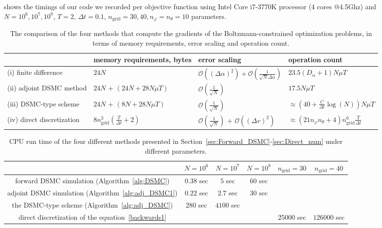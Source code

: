 \documentclass[times,final,nopreprintline]{elsarticle}
\newcommand{\cO}{\mathcal O} \newcommand{\cP}{\mathcal P}
\begin{document}
 shows the timings of our code we recorded per objective function using Intel Core i7-3770K processor (4 cores @4.5Ghz) and $N=10^6,10^7,10^8$, $T=2$, $\Delta t=0.1$, $n_\text{grid}=30,40, n_{\varphi}=n_{\theta}=10$ parameters.

\begin{table} %
\footnotesize
\setlength{\tabcolsep}{4pt}
\centering 
\begin{tabular}{|m{3.2cm}|m{3.3cm}|m{3.0cm}|m{3.1cm}|} 
  \hline
   &  memory requirements, bytes  & error scaling & operation count \\
  \hline 
(i) finite difference                         &    $24N$                                  & $\cO((\Delta \alpha)^2)+\cO(\frac{1}{\sqrt{N} \Delta \alpha})$    &  $23.5 (D_\alpha+1) N\mu T$  \\
(ii) adjoint DSMC method                                      &  $24N$ + $(24N + 28 N\mu T)$                    & $\cO(\frac{1}{\sqrt{N}})$              & $17.5 N\mu T$  \\
(iii) DSMC-type scheme & $24N$ + $(8N + 28 N\mu T)$                                   & $\cO(\frac{1}{\sqrt{N}})$              & $\approx (40 + \frac{C}{\Delta t} \log(N)) N\mu T$  \\
(iv) direct discretization &  $8 n_\text{grid}^3 (\frac{T}{\Delta t}+2)$  & $\cO(\frac{1}{\sqrt{N}})$ + $\cO((\Delta v)^2)$  & $\approx (21 n_{\varphi}n_{\theta}+4)n_\text{grid}^6 \frac{T}{\Delta t}$  \\
   \hline
\end{tabular}
  \caption{The comparison of the four methods that compute the gradients of the Boltzmann-constrained optimization problems, in terms of memory requirements, error scaling and operation count.}  \label{Table7}
\end{table}




\begin{table} %
\centering
{\renewcommand{\arraystretch}{1.2}%
\begin{tabular}{|c|c|c|c|c|c|}   \hline 
 \quad  &  $N = 10^6$  & $N = 10^7$ & $N = 10^8$ & $n_\text{grid}=30$& $n_\text{grid}=40$ \\
  \hline 
forward DSMC simulation (Algorithm~\ref{alg:DSMC}) &    $0.38$   sec & $5$ sec &  $60$ sec  & &\\
adjoint DSMC simulation (Algorithm~\ref{alg:adj_DSMC1}) &  $0.22$ sec & $2.7$ sec & $30$ sec & & \\
the DSMC-type scheme (Algorithm~\ref{alg:adj_DSMC}) &  $280$  sec  & $4100$ sec &\quad & & \\
direct discretization of the equation~\eqref{backwards1} &   &  & & $25000$ sec & $126000$ sec\\
   \hline
\end{tabular} }
  \caption{CPU run time of the four different methods presented in Section~\ref{sec:Forward_DSMC}-\ref{sec:Direct_num} under different parameters.} \label{Table8}
\end{table}
\end{document}

